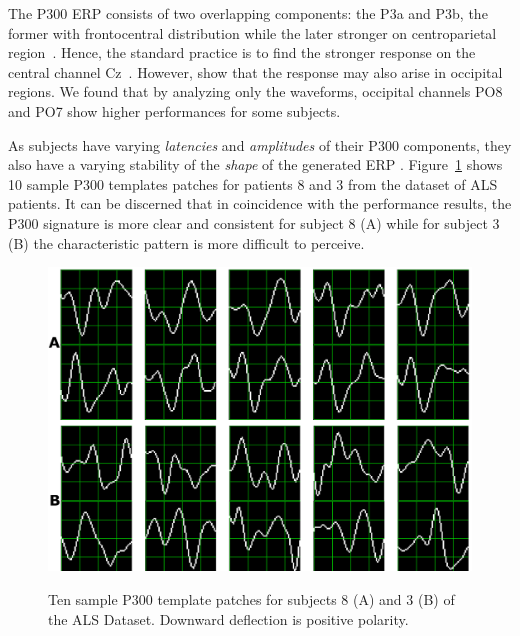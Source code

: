  

The P300 ERP  consists of two overlapping components: the P3a and P3b, the former with frontocentral distribution while the later stronger on centroparietal region~\cite{Polich2007}. Hence, the standard practice is to find the stronger response on the central channel Cz~\cite{Riccio2013}. However, \cite{Krusienski2006} show that the response may also arise in occipital regions.  We found that by analyzing only the waveforms, occipital channels PO8 and PO7 show higher performances for some subjects. 


As subjects have varying \textit{latencies} and \textit{amplitudes} of their P300 components, they also have a varying stability of the \textit{shape} of the generated ERP \cite{Nam2010}.  Figure~\ref{fig:p300templates} shows 10 sample P300 templates patches for patients 8 and 3 from the dataset of ALS patients. It can be discerned that in coincidence with the performance results, the P300 signature is more clear and consistent for subject 8 (A) while for subject 3 (B) the characteristic pattern is more difficult to perceive.

\begin{figure}[h!]
\centering
\includegraphics[width=15cm]{images/subject.png}\label{subject8}
\caption[Sample P300 Patches]{Ten sample P300 template patches for subjects 8 (A) and 3 (B) of the ALS Dataset.  Downward deflection is positive polarity. }
\label{fig:p300templates}
\end{figure}


